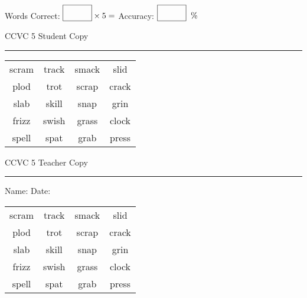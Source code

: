 \documentclass{memoir}
\begin{document}
\small

Words Correct: $\fbox{\phantom{\huge 100}} \times 5 = $ Accuracy: $\fbox{\phantom{\huge 100}}\;\; \%$ 

\vfill

\newpage


\footnotesize \noindent
CCVC 5 \hfill Student Copy
\smallskip
\hrule

\Large

\setlength{\tabcolsep}{14pt}
\def\arraystretch{3}

{\selectfont


\begin{vplace}[0.5]
\begin{center}
\begin{tabular}{cccc}
scram & track       & smack & slid \\
plod & trot & scrap & crack       \\
slab             & skill & snap & grin     \\
frizz & swish & grass                    & clock \\
spell & spat            & grab                    & press       \\
\end{tabular}
\end{center}
\end{vplace}

}

\newpage

\footnotesize \noindent
CCVC 5 \hfill Teacher Copy
\smallskip
\hrule

\small

\vfill

\noindent
Name: \underline{\hspace{1.75in}} \hfill Date: \underline{\hspace{1in}}

\Large

{\selectfont


\begin{vplace}[0.5]
\begin{center}
\begin{tabular}{cccc}
scram & track       & smack & slid \\
plod & trot & scrap & crack       \\
slab             & skill & snap & grin     \\
frizz & swish & grass                    & clock \\
spell & spat            & grab                    & press       \\
\end{tabular}
\end{center}
\end{vplace}



}
\end{document}
